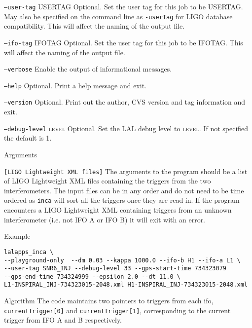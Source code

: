 \begin{entry}
\begin{entry}
\item[\texttt{--user-tag} \textsc{USERTAG}] Optional. Set the user tag
for this job to be \textsc{USERTAG}. May also be specified on the command
line as \texttt{-userTag} for LIGO database compatibility.  This will
affect the naming of the output file.

\item[\texttt{--ifo-tag} \textsc{IFOTAG}] Optional. Set the user tag for
this job to be \textsc{IFOTAG}.  This will affect the naming of the
output file.

\item[\texttt{--verbose}] Enable the output of informational messages.


\item[\texttt{--help}] Optional.  Print a help message and exit.

\item[\texttt{--version}] Optional.  Print out the author, CVS version and
tag information and exit.

\item[\texttt{--debug-level} \textsc{level}] Optional. Set the LAL debug
level to \textsc{level}. If not specified the default is 1.

\end{entry}

\item[Arguments]\leavevmode
\begin{entry}
\item[\texttt{[LIGO Lightweight XML files]}] The arguments to the program
should be a list of LIGO Lightweight XML files containing the triggers from
the two interferometers. The input files can be in any order and do not need
to be time ordered as \texttt{inca} will sort all the triggers once they are
read in. If the program encounters a LIGO Lightweight XML containing triggers
from an unknown interferometer (i.e. not IFO A or IFO B) it will exit with an
error.
\end{entry}

\item[Example]
\begin{verbatim}
lalapps_inca \
--playground-only  --dm 0.03 --kappa 1000.0 --ifo-b H1 --ifo-a L1 \
--user-tag SNR6_INJ --debug-level 33 --gps-start-time 734323079
--gps-end-time 734324999 --epsilon 2.0 --dt 11.0 \
L1-INSPIRAL_INJ-734323015-2048.xml H1-INSPIRAL_INJ-734323015-2048.xml
\end{verbatim}

\item[Algorithm]
The code maintains two pointers to triggers from each ifo,
\texttt{currentTrigger[0]} and \texttt{currentTrigger[1]}, corresponding to
the current trigger from IFO A and B respectively.


\end{entry}
